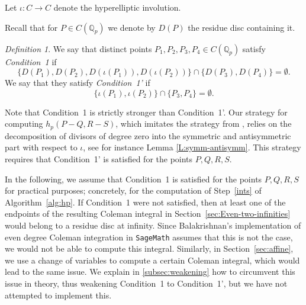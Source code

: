 \documentclass[11pt, a4paper]{amsart}
\newcommand{\Q}{\mathbb{Q}}
\theoremstyle{remark}
\newtheorem{definition}[theorem]{Definition}
\numberwithin{equation}{section}
\newcommand{\sm}{{}}
\begin{document}
Let $\iota\colon C\rightarrow C$ denote the hyperelliptic involution. 
\sm{
Recall that for $P\in C(\Q_p)$ we denote by $D(P)$ the residue disc containing it.
\begin{definition}\label{def:conds} We say that 
   distinct points $P_1,P_2,P_3,P_4\in C(\Q_p)$ satisfy \textit{Condition~1} if
  $$\{D(P_1), D(P_2), D(\iota(P_1)), D(\iota(P_2))\}\cap
  \{D(P_3),D(P_4)\} = \emptyset.$$
  We say that they satisfy \textit{Condition~1'} if 
  $$\{\iota(P_1),\iota(P_2)\}\cap \{P_3,P_4\} = \emptyset.$$ 
\end{definition}

Note that Condition~1 is strictly stronger than Condition~1'.
Our strategy for computing $h_p(P-Q, R-S)$, which imitates the strategy from \cite{BBHeights}, relies on the decomposition of divisors of degree zero into the symmetric and antisymmetric part with respect to $\iota$, see for instance Lemma \ref{L:symm-antisymm}. 
This strategy requires that Condition~1' is satisfied for the points $P,Q,R,S$.


In the following, we assume that Condition~1 is satisfied for the points $P,Q,R,S$ for practical purposes; concretely, for the computation of Step~\eqref{ints} of Algorithm~\ref{alg:hp}. If Condition~1 were not satisfied, then at least one of the endpoints of the resulting Coleman integral in Section~\ref{sec:Even-two-infinities} would belong to a residue disc at infinity. Since
Balakrishnan's implementation \cite{Jen-Even-Degree-CI} of even degree Coleman integration in {\tt SageMath} assumes that this is not the case, we would not be able to compute this integral. Similarly, in Section~\ref{sec:affine}, we use a change of variables to compute a certain Coleman integral, which would lead to the same issue. We explain in \cref{subsec:weakening} how to circumvent this issue in theory, thus weakening Condition~1 to Condition~1', but we have not attempted to implement this.}

\end{document}
